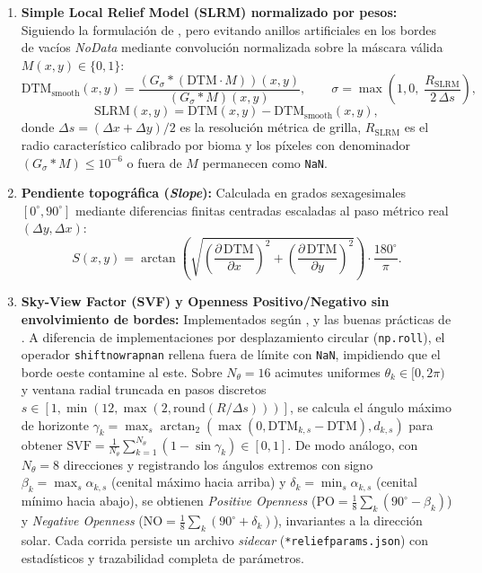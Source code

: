 \documentclass[11pt,a4paper]{article}
\DeclareRobustCommand{\_}{\ifmmode\mbox{\textunderscore}\else\textunderscore\allowbreak\fi}
\begin{document}
\begin{enumerate}
  \item \textbf{Simple Local Relief Model (SLRM) normalizado por pesos:} Siguiendo la formulaci\'on de \citet{Hesse2010}, pero evitando anillos artificiales en los bordes de vac\'ios \emph{NoData} mediante convoluci\'on normalizada sobre la m\'ascara v\'alida $M(x,y) \in \{0,1\}$:
  \begin{equation}
  \mathrm{DTM}_{\mathrm{smooth}}(x,y) = \frac{\left(G_{\sigma} * (\mathrm{DTM}\cdot M)\right)(x,y)}{\left(G_{\sigma} * M\right)(x,y)}, \qquad \sigma = \max\!\left(1{,}0,\; \frac{R_{\mathrm{SLRM}}}{2\,\Delta s}\right),
  \label{eq:slrm_trend}
  \end{equation}
  \begin{equation}
  \mathrm{SLRM}(x,y) = \mathrm{DTM}(x,y) - \mathrm{DTM}_{\mathrm{smooth}}(x,y),
  \label{eq:slrm}
  \end{equation}
  donde $\Delta s = (\Delta x + \Delta y)/2$ es la resoluci\'on m\'etrica de grilla, $R_{\mathrm{SLRM}}$ es el radio caracter\'istico calibrado por bioma y los p\'ixeles con denominador $(G_\sigma * M) \le 10^{-6}$ o fuera de $M$ permanecen como \texttt{NaN}.
  \item \textbf{Pendiente topogr\'afica (\emph{Slope}):} Calculada en grados sexagesimales $[0^\circ, 90^\circ]$ mediante diferencias finitas centradas escaladas al paso m\'etrico real $(\Delta y, \Delta x)$:
  \begin{equation}
  S(x,y) = \arctan\!\left(\sqrt{\left(\frac{\partial\,\mathrm{DTM}}{\partial x}\right)^{\!2} + \left(\frac{\partial\,\mathrm{DTM}}{\partial y}\right)^{\!2}}\right) \cdot \frac{180^\circ}{\pi}.
  \label{eq:slope}
  \end{equation}
  \item \textbf{Sky-View Factor (SVF) y Openness Positivo/Negativo sin envolvimiento de bordes:} Implementados seg\'un \citet{Zaksek2011}, \citet{Yokoyama2002} y las buenas pr\'acticas de \citet{KokaljHesse2017}. A diferencia de implementaciones por desplazamiento circular (\texttt{np.roll}), el operador \texttt{\_shift\_no\_wrap\_nan} rellena fuera de l\'imite con \texttt{NaN}, impidiendo que el borde oeste contamine al este. Sobre $N_\theta = 16$ acimutes uniformes $\theta_k \in [0, 2\pi)$ y ventana radial truncada en pasos discretos $s \in [1, \min(12, \max(2, \mathrm{round}(R/\Delta s)))]$, se calcula el \'angulo m\'aximo de horizonte $\gamma_k = \max_s \arctan_2(\max(0, \mathrm{DTM}_{k,s} - \mathrm{DTM}), d_{k,s})$ para obtener $\mathrm{SVF} = \frac{1}{N_\theta}\sum_{k=1}^{N_\theta} (1 - \sin\gamma_k) \in [0, 1]$. De modo an\'alogo, con $N_\theta = 8$ direcciones y registrando los \'angulos extremos con signo $\beta_k = \max_s \alpha_{k,s}$ (cenital m\'aximo hacia arriba) y $\delta_k = \min_s \alpha_{k,s}$ (cenital m\'inimo hacia abajo), se obtienen \emph{Positive Openness} ($\mathrm{PO} = \frac{1}{8}\sum_k (90^\circ - \beta_k)$) y \emph{Negative Openness} ($\mathrm{NO} = \frac{1}{8}\sum_k (90^\circ + \delta_k)$), invariantes a la direcci\'on solar. Cada corrida persiste un archivo \emph{sidecar} (\texttt{*\_relief\_params.json}) con estad\'isticos y trazabilidad completa de par\'ametros.
\end{enumerate}
\end{document}
